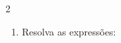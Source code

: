 \documentclass[a4paper,14pt]{article}
\begin{document}
\begin{multicols}{2}
\begin{enumerate}
\begin{enumerate}[a)]
				\item $\frac{\bigg[4^{13} : 4^5\bigg]^{-3}}{4^{-20}}$ \\\\\\\\\\\\\\\\\\\\\\\\\\\\\\\\
				\item $\frac{512 \cdot 64}{2 048}$ \\\\\\\\\\\\\\\\\\\\\\\\\\\\\\\\\\\\
				\item $\frac{[25 \cdot 125]^3}{(625)^4}$ \newpage
			\end{enumerate}
			\item Resolva as expressões:
			\begin{enumerate}[a)]

\end{enumerate}
\end{enumerate}
\end{multicols}
\end{document}
